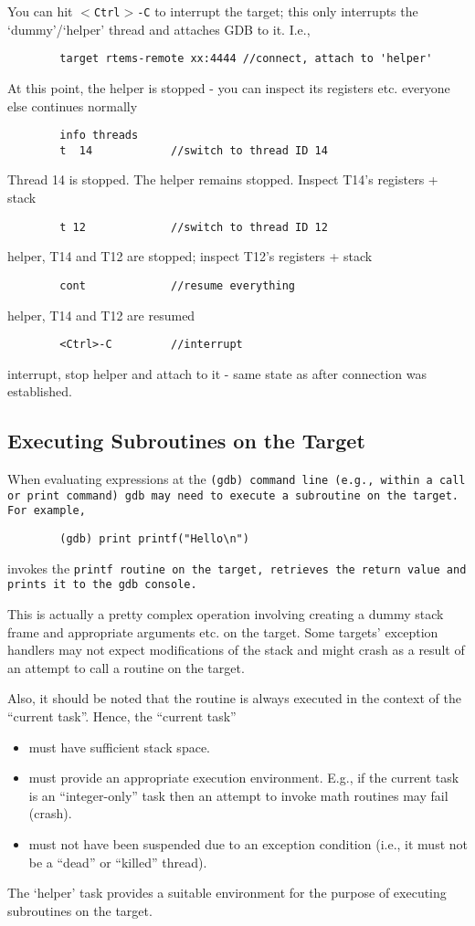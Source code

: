 \documentclass{article}
\newcommand{\cmd}[1]{{\tt #1}}
\begin{document}
	You can hit \cmd{$<$Ctrl$>$-C} to interrupt the target; this
	only interrupts the `dummy'/`helper' thread and
	attaches GDB to it.  I.e., 
\begin{verbatim}
		target rtems-remote xx:4444 //connect, attach to 'helper'
\end{verbatim}
	At this point, the helper is stopped - you can inspect its
	registers etc. everyone else continues normally
\begin{verbatim}
		info threads
		t  14            //switch to thread ID 14
\end{verbatim}
	Thread 14 is stopped. The helper remains stopped. Inspect
	T14's registers + stack
\begin{verbatim}
		t 12             //switch to thread ID 12
\end{verbatim}
	helper, T14 and T12 are stopped; inspect T12's registers + stack
\begin{verbatim}
		cont             //resume everything
\end{verbatim}
	helper, T14 and T12 are resumed
\begin{verbatim}
		<Ctrl>-C         //interrupt
\end{verbatim}
	interrupt, stop helper and attach to it - same state as
	after connection was established.

\subsection{Executing Subroutines on the Target}
When evaluating expressions at the \tt{(gdb)} command line (e.g., within
a \tt{call} or \tt{print} command) gdb may need to execute a subroutine
on the target. For example,
\begin{verbatim}
		(gdb) print printf("Hello\n")
\end{verbatim}
invokes the \tt{printf} routine on the target, retrieves the return value
and prints it to the \tt{gdb} console.

This is actually a pretty complex operation involving creating a dummy stack
frame and appropriate arguments etc. on the target. Some targets' exception
handlers may not expect modifications of the stack and might crash as a result
of an attempt to call a routine on the target.

Also, it should be noted that the routine is always executed in the
context of the ``current task''. Hence, the ``current task''
\begin{itemize}
\item must have sufficient stack space.
\item must provide an appropriate execution environment. E.g., if the
      current task is an ``integer-only'' task then an attempt to invoke
      math routines may fail (crash).
\item must not have been suspended due to an exception condition (i.e.,
      it must not be a ``dead'' or ``killed'' thread).
\end{itemize}
The `helper' task provides a suitable environment for the purpose of
executing subroutines on the target.
\end{document}
